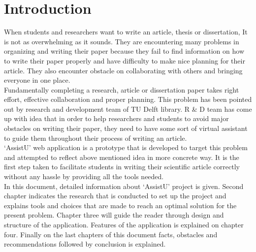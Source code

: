 \chapter{Introduction}

When students and researchers want to write an article, thesis or dissertation, It is not as overwhelming as it sounds. They are encountering many problems in organizing and writing their paper because they fail to find information on how to write their paper properly and have difficulty to make nice planning for their article. They also encounter obstacle on collaborating with others and bringing everyone in one place. \\

Fundamentally completing a research, article or dissertation paper takes right effort, effective collaboration and proper planning. This problem has been pointed out by research and development team of TU Delft library. R \& D team has come up with idea that in order to help researchers and students to avoid major obstacles on writing their paper, they need to have some sort of virtual assistant to guide them throughout their process of writing an article.\\

`AssistU' web application is a prototype  that is developed to target this problem and attempted to reflect above mentioned idea in more concrete way. It is the first step taken to facilitate students in writing their scientific article correctly without any hassle by providing all the tools needed.\\ 

In this document, detailed information about `AssistU' project is given. Second chapter indicates the research that is conducted to set up the project and explains tools and choices that are made to reach an optimal solution for the present problem. Chapter three will guide the reader through design and structure of the application. Features of the application is explained on chapter four. Finally on the last chapters of this document facts, obstacles and recommendations followed by conclusion is explained.  